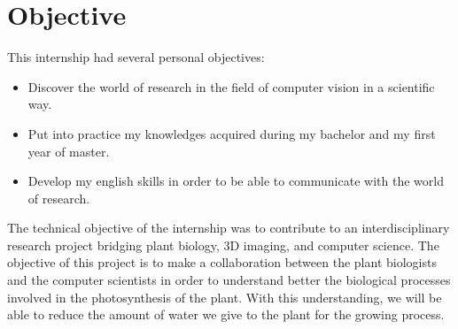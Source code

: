 \chapter{Objective}

This internship had several personal objectives:

\begin{itemize}
    \item Discover the world of research in the field of computer vision in
    a scientific way.
    \item Put into practice my knowledges acquired during my bachelor and my
    first year of master.
    \item Develop my english skills in order to be able to communicate with
    the world of research.
\end{itemize}
%
The technical objective of the internship was to contribute to an interdisciplinary
research project bridging plant biology, 3D imaging, and computer science. The 
objective of this project is to make a collaboration between the plant biologists
and the computer scientists in order to understand better the biological processes
involved in the photosynthesis of the plant. With this understanding, we will be able 
to reduce the amount of water we give to the plant for the growing process.
